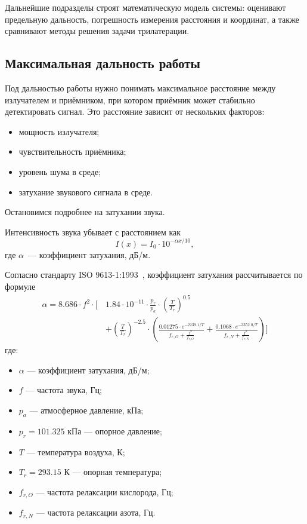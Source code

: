 Дальнейшие подразделы строят математическую модель системы: оценивают предельную
дальность, погрешность измерения расстояния и координат, а также сравнивают методы
решения задачи трилатерации.

\subsection{Максимальная дальность работы}
\label{sec:max-range}
Под дальностью работы нужно понимать максимальное расстояние между излучателем и
приёмником, при котором приёмник может стабильно детектировать сигнал.
Это расстояние зависит от нескольких факторов:

\begin{itemize}
  \item мощность излучателя;
  \item чувствительность приёмника;
  \item уровень шума в среде;
  \item затухание звукового сигнала в среде.
\end{itemize}
Остановимся подробнее на затухании звука.

Интенсивность звука убывает с расстоянием как
\begin{equation}
 I(x) = I_0 \cdot 10^{-\alpha x / 10},
\end{equation}
где $\alpha$~--- коэффициент затухания, дБ/м.

Согласно стандарту ISO 9613-1:1993~\cite{iso9613}, коэффициент затухания
рассчитывается по формуле
\begin{equation}\label{iso}
\begin{aligned}
\alpha = 8.686 \cdot f^{2} \cdot \Bigg[\, & 1.84 \cdot 10^{-11} \cdot \frac{p_r}{p_a} \cdot \left(\frac{T}{T_r}\right)^{0.5} \\
& + \left(\frac{T}{T_r}\right)^{-2.5} \cdot \left( \frac{0.01275 \cdot e^{-2239.1/T}}{f_{r,O} + \frac{f^{2}}{f_{r,O}}} + \frac{0.1068 \cdot e^{-3352.0/T}}{f_{r,N} + \frac{f^{2}}{f_{r,N}}} \right) \Bigg]
\end{aligned}
\end{equation}
где:
\begin{itemize}
\item $\alpha$ — коэффициент затухания, дБ/м;
\item $f$ — частота звука, Гц;
\item $p_a$ — атмосферное давление, кПа;
\item $p_r = 101.325$ кПа — опорное давление;
\item $T$ — температура воздуха, К;
\item $T_r = 293.15$ К — опорная температура;
\item $f_{r,O}$ — частота релаксации кислорода, Гц;
\item $f_{r,N}$ — частота релаксации азота, Гц.
\end{itemize}

